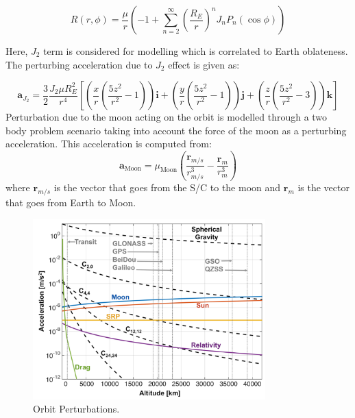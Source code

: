 \documentclass{article}
\begin{document}
\begin{equation*}
	R(r, \phi) = \frac{\mu}{r} \left( -1 + \sum_{n=2}^{\infty} \left( \frac{R_E}{r} \right)^n J_n P_n(\cos\phi) \right)
\end{equation*}

Here, \( J_2 \) term is considered for modelling which is correlated to Earth oblateness. The perturbing acceleration due to \( J_2 \) effect is given as:

\begin{equation*}
	\mathbf{a}_{J_2} = \frac{3}{2} \frac{J_2 \mu R_E^2}{r^4} \left[ \left( \frac{x}{r} \left( \frac{5z^2}{r^2} - 1 \right) \right) \mathbf{i} + \left( \frac{y}{r} \left( \frac{5z^2}{r^2} - 1 \right) \right) \mathbf{j} + \left( \frac{z}{r} \left( \frac{5z^2}{r^2} - 3 \right) \right) \mathbf{k} \right]
\end{equation*}
Perturbation due to the moon acting on the orbit is modelled through a two body problem scenario taking into account the force of the moon as a perturbing acceleration. This acceleration is computed from:
\begin{equation*}
	\label{eq:moon_perturbation}
	\mathbf{a}_{\text{Moon}} = \mu_{\text{Moon}}
	\left( \frac{\mathbf{r}_{m/s}}{r_{m/s}^3} - \frac{\mathbf{r}_m}{r_m^3} \right)
\end{equation*}
where \( \mathbf{r}_{m/s} \) is the vector that goes from the S/C to the moon and \( \mathbf{r}_m \) is the vector that goes from Earth to Moon. 

\begin{figure}[ht]
	\centering
	\includegraphics[width=0.8\textwidth]{Perturbation chart.png}
	\caption{Orbit Perturbations.}
	\label{fig:orbit perturbations}
\end{figure}
\end{document}
